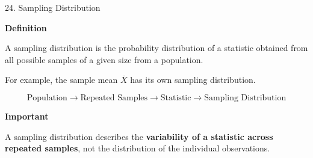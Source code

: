 \begin{frame}{24. Sampling Distribution}

\textbf{Definition}

A sampling distribution is the probability distribution of a
statistic obtained from all possible samples of a given size
from a population.

\vspace{0.4cm}

For example, the sample mean $\bar{X}$ has its own sampling
distribution.

\vspace{0.3cm}

\[
\boxed{
\text{Population}
\rightarrow
\text{Repeated Samples}
\rightarrow
\text{Statistic}
\rightarrow
\text{Sampling Distribution}
}
\]

\vspace{0.3cm}

\textbf{Important}

A sampling distribution describes the \textbf{variability of a
statistic across repeated samples}, not the distribution of the
individual observations.

\end{frame}



